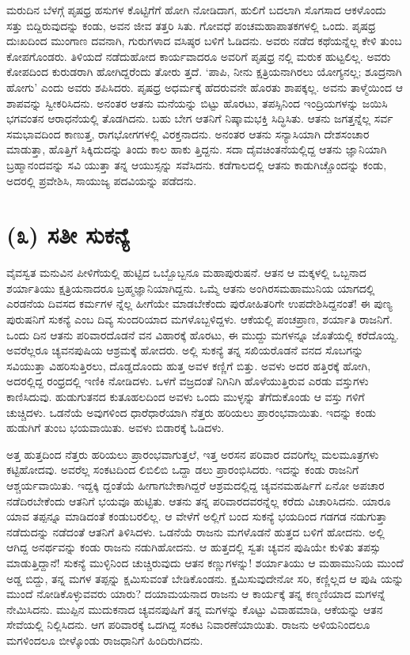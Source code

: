 ಮರುದಿನ ಬೆಳಗ್ಗೆ ಪೃಷಧ್ರ ಹಸುಗಳ ಕೊಟ್ಟಿಗೆಗೆ ಹೋಗಿ ನೋಡಿದಾಗ, ಹುಲಿಗೆ ಬದಲಾಗಿ ಸೊಗಸಾದ ಆಕಳೊಂದು ಸತ್ತು ಬಿದ್ದಿರುವುದನ್ನು ಕಂಡು, ಅವನ ಜೀವ ತತ್ತರಿ ಸಿತು. ಗೋವಧೆ ಪಂಚಮಹಾಪಾತಕಗಳಲ್ಲಿ ಒಂದು. ಪೃಷಧ್ರ ದುಃಖದಿಂದ ಮುಂಗಾಣ ದವನಾಗಿ, ಗುರುಗಳಾದ ವಸಿಷ್ಠರ ಬಳಿಗೆ ಓಡಿದನು. ಅವರು ನಡೆದ ಕಥೆಯನ್ನೆಲ್ಲ ಕೇಳಿ ತುಂಬ ಕೋಪಗೊಂಡರು. ತಿಳಿಯದೆ ನಡೆದುಹೋದ ಕಾರ್ಯವಾದರೂ ಅವರಿಗೆ ಪೃಷಧ್ರ ನಲ್ಲಿ ಮರುಕ ಹುಟ್ಟಲಿಲ್ಲ. ಅವರು ಕೋಪದಿಂದ ಕುರುಡರಾಗಿ ಹೋಗಿದ್ದರೆಂದು ತೋರು ತ್ತದೆ. ‘ಪಾಪಿ, ನೀನು ಕ್ಷತ್ರಿಯನಾಗಿರಲು ಯೋಗ್ಯನಲ್ಲ; ಶೂದ್ರನಾಗಿ ಹೋಗು’ ಎಂದು ಅವರು ಶಪಿಸಿದರು. ಪೃಷಧ್ರ ಅಧರ್ಮಕ್ಕೆ ಹೆದರುವನೇ ಹೊರತು ಶಾಪಕ್ಕಲ್ಲ. ಅವನು ತಾಳ್ಮೆಯಿಂದ ಆ ಶಾಪವನ್ನು ಸ್ವೀಕರಿಸಿದನು. ಅನಂತರ ಆತನು ಮನೆಯನ್ನು ಬಿಟ್ಟು ಹೊರಟು, ತಪಸ್ಸಿನಿಂದ ಇಂದ್ರಿಯಗಳನ್ನು ಜಯಿಸಿ ಭಗವಂತನ ಆರಾಧನೆಯಲ್ಲಿ ತೊಡಗಿದನು. ಬಹು ಬೇಗ ಆತನಿಗೆ ನಿಷ್ಕಾಮಭಕ್ತಿ ಸಿದ್ಧಿಸಿತು. ಆತನು ಜಗತ್ತನ್ನೆಲ್ಲ ಸರ್ವ ಸಮಭಾವದಿಂದ ಕಾಣುತ್ತ, ರಾಗಭೋಗಗಳಲ್ಲಿ ವಿರಕ್ತನಾದನು. ಅನಂತರ ಆತನು ಸನ್ಯಾಸಿಯಾಗಿ ದೇಶಸಂಚಾರ ಮಾಡುತ್ತಾ, ಹೊತ್ತಿಗೆ ಸಿಕ್ಕಿದುದನ್ನು ತಿಂದು ಕಾಲ ಹಾಕು ತ್ತಿದ್ದನು. ಸದಾ ದೈವಚಿಂತನೆಯಲ್ಲಿದ್ದ ಆತನು ಜ್ಞಾನಿಯಾಗಿ ಬ್ರಹ್ಮಾನಂದವನ್ನು ಸವಿ ಯುತ್ತಾ ತನ್ನ ಆಯುಸ್ಸನ್ನು ಸವೆಸಿದನು. ಕಡೆಗಾಲದಲ್ಲಿ ಆತನು ಕಾಡುಗಿಚ್ಚೊಂದನ್ನು ಕಂಡು, ಅದರಲ್ಲಿ ಪ್ರವೇಶಿಸಿ, ಸಾಯುಜ್ಯ ಪದವಿಯನ್ನು ಪಡೆದನು.


\section{(೩) ಸತೀ ಸುಕನ್ಯೆ}

ವೈವಸ್ವತ ಮನುವಿನ ಪೀಳಿಗೆಯಲ್ಲಿ ಹುಟ್ಟಿದ ಒಬ್ಬೊಬ್ಬನೂ ಮಹಾಪುರುಷನೆ. ಆತನ ಆ ಮಕ್ಕಳಲ್ಲಿ ಒಬ್ಬನಾದ ಶರ್ಯಾತಿಯು ಕ್ಷತ್ರಿಯನಾದರೂ ಬ್ರಹ್ಮಜ್ಞಾನಿಯಾಗಿದ್ದನು. ಒಮ್ಮೆ ಆತನು ಅಂಗಿರಸಮಹಾಮುನಿಯ ಯಾಗದಲ್ಲಿ ಎರಡನೆಯ ದಿವಸದ ಕರ್ಮಗಳ ನ್ನೆಲ್ಲ ಹೀಗೆಯೇ ಮಾಡಬೇಕೆಂದು ಪುರೋಹಿತರಿಗೇ ಉಪದೇಶಿಸಿದ್ದನಂತೆ! ಈ ಪುಣ್ಯ ಪುರುಷನಿಗೆ ಸುಕನ್ಯೆ ಎಂಬ ದಿವ್ಯ ಸುಂದರಿಯಾದ ಮಗಳೊಬ್ಬಳಿದ್ದಳು. ಆಕೆಯಲ್ಲಿ ಪಂಚಪ್ರಾಣ, ಶರ್ಯಾತಿ ರಾಜನಿಗೆ. ಒಂದು ದಿನ ಆತನು ಪರಿವಾರದೊಡನೆ ವನ ವಿಹಾರಕ್ಕೆ ಹೊರಟು, ಈ ಮುದ್ದು ಮಗಳನ್ನೂ ಜೊತೆಯಲ್ಲಿ ಕರೆದೊಯ್ದ. ಅವರೆಲ್ಲರೂ ಚ್ಯವನಪುಷಿಯ ಆಶ್ರಮಕ್ಕೆ ಹೋದರು. ಅಲ್ಲಿ ಸುಕನ್ಯೆ ತನ್ನ ಸಖಿಯರೊಡನೆ ವನದ ಸೊಬಗನ್ನು ಸವಿಯುತ್ತಾ ವಿಹರಿಸುತ್ತಿರಲು, ದೊಡ್ಡದೊಂದು ಹುತ್ತ ಅವಳ ಕಣ್ಣಿಗೆ ಬಿತ್ತು. ಅವಳು ಅದರ ಹತ್ತಿರಕ್ಕೆ ಹೋಗಿ, ಅದರಲ್ಲಿದ್ದ ರಂಧ್ರದಲ್ಲಿ ಇಣಿಕಿ ನೋಡಿದಳು. ಒಳಗೆ ವಜ್ರದಂತೆ ನಿಗಿನಿಗಿ ಹೊಳೆಯುತ್ತಿರುವ ಎರಡು ವಸ್ತುಗಳು ಕಾಣಿಸಿದುವು. ಹುಡುಗುತನದ ಕುತೂಹಲದಿಂದ ಅವಳು ಒಂದು ಮುಳ್ಳನ್ನು ತೆಗೆದುಕೊಂಡು ಆ ವಸ್ತು ಗಳಿಗೆ ಚುಚ್ಚಿದಳು. ಒಡನೆಯೆ ಅವುಗಳಿಂದ ಧಾರೆಧಾರೆಯಾಗಿ ನೆತ್ತರು ಹರಿಯಲು ಪ್ರಾರಂಭವಾಯಿತು. ಇದನ್ನು ಕಂಡು ಹುಡುಗಿಗೆ ತುಂಬ ಭಯವಾಯಿತು. ಅವಳು ಬಿಡಾರಕ್ಕೆ ಓಡಿದಳು.

ಅತ್ತ ಹುತ್ತದಿಂದ ನೆತ್ತರು ಹರಿಯಲು ಪ್ರಾರಂಭವಾಗುತ್ತಲೆ, ಇತ್ತ ಅರಸನ ಪರಿವಾರ ದವರಿಗೆಲ್ಲ ಮಲಮೂತ್ರಗಳು ಕಟ್ಟಿಹೋದವು. ಅವರೆಲ್ಲ ಸಂಕಟದಿಂದ ಲಿಬಿಲಿಬಿ ಒದ್ದಾ ಡಲು ಪ್ರಾರಂಭಿಸಿದರು. ಇದನ್ನು ಕಂಡು ರಾಜನಿಗೆ ಆಶ್ಚರ್ಯವಾಯಿತು. ಇದ್ದಕ್ಕಿ ದ್ದಂತೆಯೆ ಹೀಗಾಗಬೇಕಾಗಿದ್ದರೆ ಆಶ್ರಮದಲ್ಲಿದ್ದ ಚ್ಯವನಮಹರ್ಷಿಗೆ ಏನೋ ಅಪಚಾರ ನಡೆದಿರಬೇಕೆಂದು ಆತನಿಗೆ ಭಯವೂ ಹುಟ್ಟಿತು. ಆತನು ತನ್ನ ಪರಿವಾರದವರನ್ನೆಲ್ಲ ಕರೆದು ವಿಚಾರಿಸಿದನು. ಯಾರೂ ಯಾವ ತಪ್ಪನ್ನೂ ಮಾಡಿದಂತೆ ಕಂಡುಬರಲಿಲ್ಲ. ಆ ವೇಳೆಗೆ ಅಲ್ಲಿಗೆ ಬಂದ ಸುಕನ್ಯೆ ಭಯದಿಂದ ಗಡಗಡ ನಡುಗುತ್ತಾ ನಡೆದುದನ್ನು ನಡೆದಂತೆ ಆತನಿಗೆ ತಿಳಿಸಿದಳು. ಒಡನೆಯೆ ರಾಜನು ಮಗಳೊಡನೆ ಹುತ್ತದ ಬಳಿಗೆ ಹೋದನು. ಅಲ್ಲಿ ಆಗಿದ್ದ ಅನರ್ಥವನ್ನು ಕಂಡು ರಾಜನು ನಡುಗಿಹೋದನು. ಆ ಹುತ್ತದಲ್ಲಿ ಸ್ವತಃ ಚ್ಯವನ ಪುಷಿಯೇ ಕುಳಿತು ತಪಸ್ಸು ಮಾಡುತ್ತಿದ್ದಾನೆ! ಸುಕನ್ಯೆ ಮುಳ್ಳಿನಿಂದ ಚುಚ್ಚಿರುವುದು ಆತನ ಕಣ್ಣುಗಳನ್ನು! ಶರ್ಯಾತಿಯು ಆ ಮಹಾಮುನಿಯ ಮುಂದೆ ಅಡ್ಡ ಬಿದ್ದು, ತನ್ನ ಮಗಳ ತಪ್ಪನ್ನು ಕ್ಷಮಿಸುವಂತೆ ಬೇಡಿಕೊಂಡನು. ಕ್ಷಮಿಸುವುದೇನೋ ಸರಿ, ಕಣ್ಣಿಲ್ಲದ ಆ ಪುಷಿ ಯನ್ನು ಮುಂದೆ ನೋಡಿಕೊಳ್ಳುವವರು ಯಾರು? ದಯಾಮಯನಾದ ರಾಜನು ಆ ಕಾರ್ಯಕ್ಕೆ ತನ್ನ ಕಣ್ಮಣಿಯಾದ ಮಗಳನ್ನೆ ನೇಮಿಸಿದನು. ಮುಪ್ಪಿನ ಮುದುಕನಾದ ಚ್ಯವನಪುಷಿಗೆ ತನ್ನ ಮಗಳನ್ನು ಕೊಟ್ಟು ವಿವಾಹಮಾಡಿ, ಆಕೆಯನ್ನು ಆತನ ಸೇವೆಯಲ್ಲಿ ನಿಲ್ಲಿಸಿದನು. ಆಗ ಪರಿವಾರಕ್ಕೆ ಒದಗಿದ್ದ ಸಂಕಟ ನಿವಾರಣೆಯಾಯಿತು. ರಾಜನು ಅಳಿಯನಿಂದಲೂ ಮಗಳಿಂದಲೂ ಬೀಳ್ಕೊಂಡು ರಾಜಧಾನಿಗೆ ಹಿಂದಿರುಗಿದನು.

